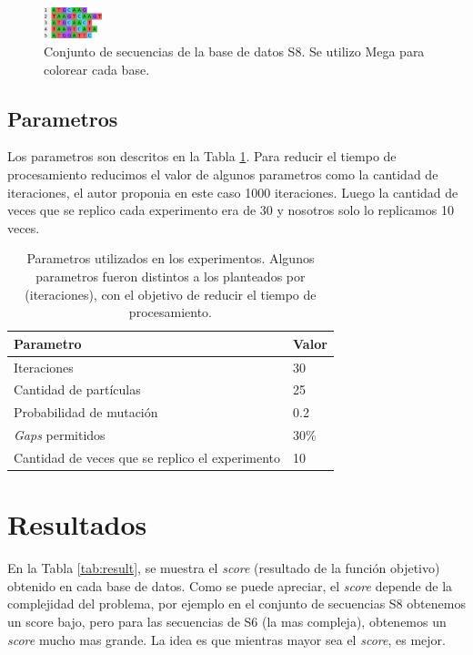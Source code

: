 \documentclass[conference]{IEEEtran}
\begin{document}
\begin{figure}[h]
	\centering
	\includegraphics[width=0.15\textwidth]{images/s8}
	\caption{Conjunto de secuencias de la base de datos S8. Se utilizo Mega para colorear cada base.}
	\label{fig:s8}
\end{figure}




\subsection{Parametros}

Los parametros son descritos en la Tabla \ref{tab:param}. Para reducir el tiempo de procesamiento reducimos el valor de algunos parametros como la cantidad de iteraciones, el autor proponia en este caso 1000 iteraciones. Luego la cantidad de veces que se replico cada experimento era de 30 y nosotros solo lo replicamos 10 veces.

\begin{table}[h]
	\centering
	\caption{Parametros utilizados en los experimentos. Algunos parametros fueron distintos a los planteados por \cite{zablocki2009multiple} (iteraciones), con el objetivo de reducir el tiempo de procesamiento.}
	\begin{tabular}{p{4cm}p{1cm}}
		
		\textbf{Parametro} & \textbf{Valor} \\
		\hline			
		Iteraciones	& 30		\\				
		Cantidad de partículas & 25 \\
		Probabilidad de mutación & 0.2 \\ 
		\textit{Gaps} permitidos & 30\% \\	
		Cantidad de veces que se replico el experimento & 10 \\		
		\hline 
	\end{tabular}		
	\label{tab:param}
\end{table}

\section{Resultados}

En la Tabla \ref{tab:result}, se muestra el \textit{score} (resultado de la función objetivo) obtenido en cada base de datos. Como se puede apreciar, el \textit{score} depende de la complejidad del problema, por ejemplo en el conjunto de secuencias S8 obtenemos un score bajo, pero para las secuencias de S6 (la mas compleja), obtenemos un \textit{score} mucho mas grande. La idea es que mientras mayor sea el \textit{score}, es mejor. \\
\end{document}

